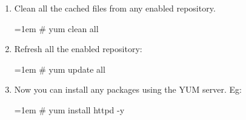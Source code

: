 \begin{flushleft}
\begin{enumerate}
		

		\item Clean all the cached files from any enabled repository.
		\begin{tcolorbox}[breakable,notitle,boxrule=-0pt,colback=black,colframe=black]
			\color{green}
			\font=1em
			\# yum	clean	all
			\font=4pt
		\end{tcolorbox}
		

		\item Refresh all the enabled repository:
		\begin{tcolorbox}[breakable,notitle,boxrule=-0pt,colback=black,colframe=black]
			\color{green}
			\font=1em
			\# yum 	update 	all
			\font=4pt
		\end{tcolorbox}


		\item Now you can install any packages using the YUM server.
		\newline
		Eg:
		\begin{tcolorbox}[breakable,notitle,boxrule=-0pt,colback=black,colframe=black]
			\color{green}
			\font=1em
			\# yum	install	httpd -y		
			\font=4pt
		\end{tcolorbox}
		

		
		
		
	\end{enumerate}

	

\end{flushleft}
\newpage



